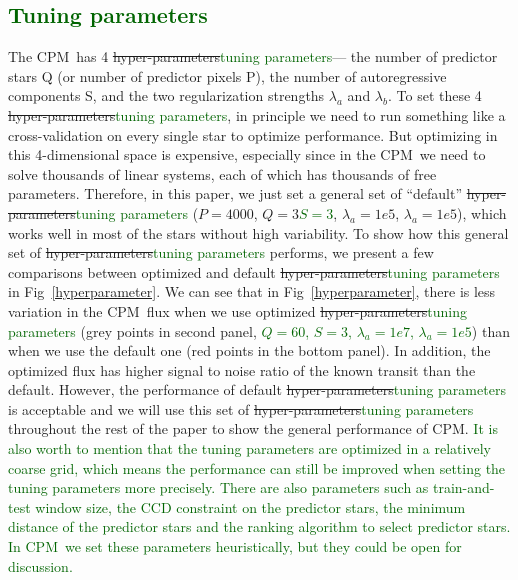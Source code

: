 \documentclass[12pt, preprint]{aastex}
\newcommand{\name}{CPM}
\newcommand{\revise}[1]{\textcolor{darkgreen}{#1}}
\newcommand{\remove}[1]{\sout{#1}}
\begin{document}
\subsection{\revise{Tuning parameters}}
The \name\ has 4 \remove{hyper-parameters}\revise{tuning parameters}--- 
  the number of predictor stars Q (or number of predictor pixels P), 
  the number of autoregressive components S, 
  and the two regularization strengths $\lambda_{a}$ and $\lambda_{b}$.
To set these 4 \remove{hyper-parameters}\revise{tuning parameters}, 
  in principle we need to run something like a cross-validation on every single star to optimize performance.
But optimizing in this 4-dimensional space is expensive, 
  especially since in the \name\ we need to solve thousands of linear systems, 
  each of which has thousands of free parameters. 
Therefore, in this paper, 
  we just set a general set of ``default'' \remove{hyper-parameters}\revise{tuning parameters} ($P=4000$, \remove{$Q=3$}\revise{$S=3$}, $\lambda_a=1e5$, $\lambda_a=1e5$), 
  which works well in most of the stars without high variability. 
To show how this general set of \remove{hyper-parameters}\revise{tuning parameters} performs, 
  we present a few comparisons between optimized and default \remove{hyper-parameters}\revise{tuning parameters} 
  in Fig~\ref{hyperparameter}.
We can see that in Fig~\ref{hyperparameter}, 
  there is less variation in the \name\ flux 
  when we use optimized \remove{hyper-parameters}\revise{tuning parameters} (grey points in second panel, \revise{$Q=60$, $S=3$, $\lambda_a=1e7$, $\lambda_a=1e5$}) 
  than when we use the default one (red points in the bottom panel). 
In addition, the optimized flux has higher signal to noise ratio of the known transit than the default. 
However, the performance of default \remove{hyper-parameters}\revise{tuning parameters} is acceptable 
  and we will use this set of \remove{hyper-parameters}\revise{tuning parameters} throughout the rest of the paper 
  to show the general performance of \name. 
\revise{It is also worth to mention that the tuning parameters are optimized in a relatively coarse grid, which means the performance can still be improved when setting the tuning parameters more precisely.}
\revise{There are also parameters such as train-and-test window size, the CCD constraint on the predictor stars, the minimum distance of the predictor stars and the ranking algorithm to select predictor stars. In \name\ we set these parameters heuristically, but they could be open for discussion.}
  
\end{document}
